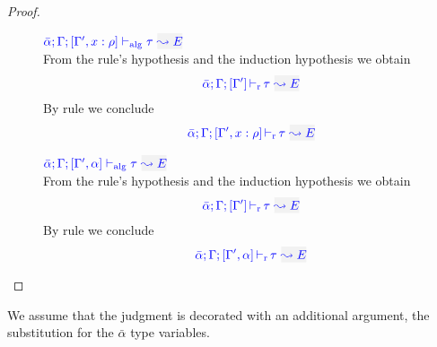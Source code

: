 \begin{proof}
\begin{description}
\item[]\quad
$\adlres{\bar\alpha}{\tenv}{\tenv',\relation{x}{\rulet}}{\type}{E}$\ \\

From the rule's hypothesis and the induction hypothesis we obtain
\begin{equation*}
  \dlres{\bar\alpha}{\tenv}{\tenv'}{\type}{E}
\end{equation*}
By rule  we conclude
\begin{equation*}
  \dlres{\bar\alpha}{\tenv}{\tenv',\relation{x}{\rulet}}{\type}{E}
\end{equation*}

\item[]\quad
$\adlres{\bar{\alpha}}{\tenv}{\tenv',\alpha}{\type}{E}$ \ \\

From the rule's hypothesis and the induction hypothesis we obtain
\begin{equation*}
  \dlres{\bar{\alpha}}{\tenv}{\tenv'}{\type}{E}
\end{equation*}
By rule  we conclude
\begin{equation*}
  \dlres{\bar{\alpha}}{\tenv}{\tenv',\alpha}{\type}{E}
\end{equation*}
\end{description}
\end{proof}

We assume that the judgment is decorated with an additional argument, the substitution
for the $\bar{\alpha}$ type variables.

